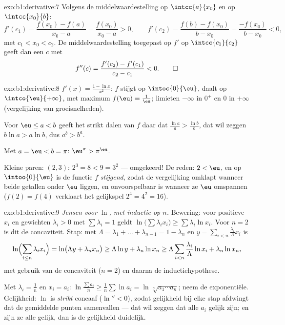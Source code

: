 \begin{solution}{exo:b1:derivative:7}
Volgens de middelwaardestelling op $\intcc{a}{x_0}$ en op
$\intcc{x_0}{b}$:
\[
f'(c_1) = \frac{f(x_0) - f(a)}{x_0 - a} = \frac{f(x_0)}{x_0 - a} > 0,
\qquad
f'(c_2) = \frac{f(b) - f(x_0)}{b - x_0} = \frac{-f(x_0)}{b - x_0} < 0,
\]
met $c_1 < x_0 < c_2$. De middelwaardestelling toegepast op $f'$ op
$\intcc{c_1}{c_2}$ geeft dan een $c$ met
\[
f''(c) = \frac{f'(c_2) - f'(c_1)}{c_2 - c_1} < 0 . \qedhere
\]
\end{solution}

\begin{solution}{exo:b1:derivative:8}
$f'(x) = \frac{1 - \ln x}{x^2}$: $f$ stijgt op $\intoc{0}{\eu}$,
daalt op $\intco{\eu}{+\infty}$, met maximum $f(\eu) = \frac1\eu$;
limieten $-\infty$ in $0^+$ en $0$ in $+\infty$ (vergelijking van
groeisnelheden).

Voor $\eu \leq a < b$ geeft het strikt dalen van $f$ daar dat
$\frac{\ln a}{a} > \frac{\ln b}{b}$, dat wil zeggen $b \ln a > a \ln
b$, dus $a^b > b^a$.

Met $a = \eu < b = \pi$: $\eu^\pi > \pi^\eu$.

Kleine paren: $(2, 3)$: $2^3 = 8 < 9 = 3^2$ --- omgekeerd! De reden:
$2 < \eu$, en op $\intoo{0}{\eu}$ is de functie $f$ \emph{stijgend},
zodat de vergelijking omklapt wanneer beide getallen onder $\eu$
liggen, en onvoorspelbaar is wanneer ze $\eu$ omspannen ($f(2) =
f(4)$ verklaart het gelijkspel $2^4 = 4^2 = 16$).
\end{solution}

\begin{solution}{exo:b1:derivative:9}
\emph{Jensen voor $\ln$, met inductie op $n$.} Bewering: voor
positieve $x_i$ en gewichten $\lambda_i > 0$ met $\sum \lambda_i =
1$ geldt $\ln\bigl(\sum \lambda_i x_i\bigr) \geq \sum \lambda_i \ln
x_i$. Voor $n = 2$ is dit de concaviteit. Stap: met $\Lambda =
\lambda_1 + \dots + \lambda_{n-1} = 1 - \lambda_n$ en $y = \sum_{i<n}
\frac{\lambda_i}{\Lambda} x_i$ is
\[
\ln\Bigl(\sum_{i \leq n} \lambda_i x_i\Bigr)
= \ln\bigl(\Lambda y + \lambda_n x_n\bigr)
\geq \Lambda \ln y + \lambda_n \ln x_n
\geq \Lambda \sum_{i<n} \frac{\lambda_i}{\Lambda}\ln x_i
+ \lambda_n \ln x_n,
\]
met gebruik van de concaviteit ($n = 2$) en daarna de
inductiehypothese.

Met $\lambda_i = \frac 1n$ en $x_i = a_i$: $\ln\frac{\sum a_i}{n}
\geq \frac 1n \sum \ln a_i = \ln\sqrt[n]{a_1\cdots a_n}$; neem de
exponentiële. Gelijkheid: $\ln$ is \emph{strikt} concaaf ($\ln'' <
0$), zodat gelijkheid bij elke stap afdwingt dat de gemiddelde
punten samenvallen --- dat wil zeggen dat alle $a_i$ gelijk zijn; en
zijn ze alle gelijk, dan is de gelijkheid duidelijk.
\end{solution}

